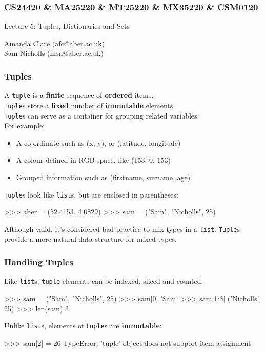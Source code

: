 \documentclass{beamer}
\begin{document}



\begin{frame}
\frametitle{CS24420 \& MA25220 \& MT25220 \& MX35220 \& CSM0120}

\begin{center}
\begin{huge}
Lecture 5: Tuples, Dictionaries and Sets
\end{huge}
\bigskip

Amanda Clare (afc@aber.ac.uk)\\
Sam Nicholls (msn@aber.ac.uk)

\end{center}
\end{frame}

\begin{frame}[fragile]
\frametitle{Tuples}
    A \texttt{tuple} is a \textbf{finite} sequence of \textbf{ordered} items.\\
    \texttt{Tuple}s store a \textbf{fixed} number of \textbf{immutable} elements.\\
    \texttt{Tuple}s can serve as a container for grouping related variables.
    \\For example:

    \begin{itemize}
        \item A co-ordinate such as (x, y), or (latitude, longitude)
        \item A colour defined in RGB space, like {\color{purple}(153, 0, 153)}
        \item Grouped information such as (firstname, surname, age)
    \end{itemize}

\vskip 0.3cm
    \texttt{Tuple}s look like \texttt{list}s, but are enclosed in parentheses:
\begin{code}
>>> aber = (52.4153, 4.0829)
>>> sam = ("Sam", "Nicholls", 25)
\end{code}
Although valid, it's considered bad practice to mix types in a \texttt{list}.
\texttt{Tuple}s provide a more natural data structure for mixed types.
\end{frame}


\begin{frame}[fragile]
\frametitle{Handling Tuples}
    Like \texttt{list}s, \texttt{tuple} elements can be indexed, sliced and counted:
\begin{code}
>>> sam = ("Sam", "Nicholls", 25)
>>> sam[0]
'Sam'
>>> sam[1:3]
('Nicholls', 25)
>>> len(sam)
3
\end{code}

\vskip 0.3cm
Unlike \texttt{list}s, elements of \texttt{tuple}s are \textbf{immutable}:
\begin{code}
>>> sam[2] = 26
TypeError: 'tuple' object does not support
           item assignment
\end{code}
\end{frame}
\end{document}
